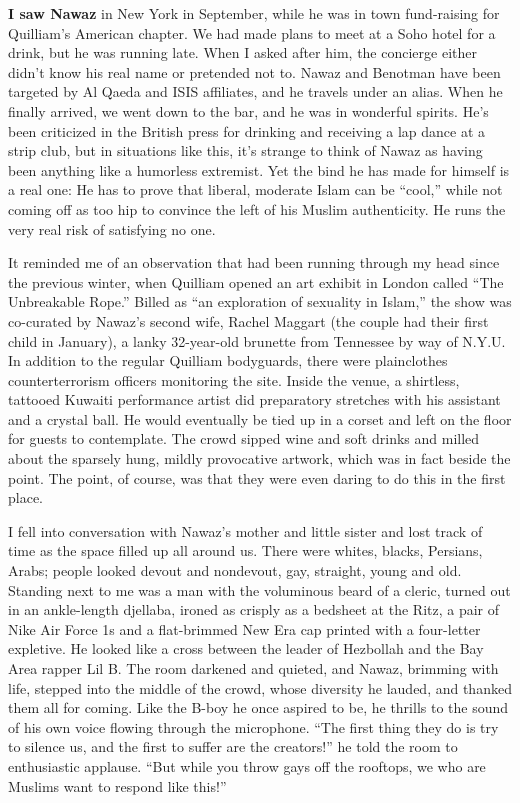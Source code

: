 \textbf{I saw Nawaz} in New York in September, while he was in town
fund-raising for Quilliam's American chapter. We had made plans to meet
at a Soho hotel for a drink, but he was running late. When I asked after
him, the concierge either didn't know his real name or pretended not to.
Nawaz and Benotman have been targeted by Al Qaeda and ISIS affiliates,
and he travels under an alias. When he finally arrived, we went down to
the bar, and he was in wonderful spirits. He's been criticized in the
British press for drinking and receiving a lap dance at a strip club,
but in situations like this, it's strange to think of Nawaz as having
been anything like a humorless extremist. Yet the bind he has made for
himself is a real one: He has to prove that liberal, moderate Islam can
be ``cool,'' while not coming off as too hip to convince the left of his
Muslim authenticity. He runs the very real risk of satisfying no one.

It reminded me of an observation that had been running through my head
since the previous winter, when Quilliam opened an art exhibit in London
called ``The Unbreakable Rope.'' Billed as ``an exploration of sexuality
in Islam,'' the show was co-curated by Nawaz's second wife, Rachel
Maggart (the couple had their first child in January), a lanky
32-year-old brunette from Tennessee by way of N.Y.U. In addition to the
regular Quilliam bodyguards, there were plainclothes counterterrorism
officers monitoring the site. Inside the venue, a shirtless, tattooed
Kuwaiti performance artist did preparatory stretches with his assistant
and a crystal ball. He would eventually be tied up in a corset and left
on the floor for guests to contemplate. The crowd sipped wine and soft
drinks and milled about the sparsely hung, mildly provocative artwork,
which was in fact beside the point. The point, of course, was that they
were even daring to do this in the first place.

I fell into conversation with Nawaz's mother and little sister and lost
track of time as the space filled up all around us. There were whites,
blacks, Persians, Arabs; people looked devout and nondevout, gay,
straight, young and old. Standing next to me was a man with the
voluminous beard of a cleric, turned out in an ankle-length djellaba,
ironed as crisply as a bedsheet at the Ritz, a pair of Nike Air Force 1s
and a flat-brimmed New Era cap printed with a four-letter expletive. He
looked like a cross between the leader of Hezbollah and the Bay Area
rapper Lil B. The room darkened and quieted, and Nawaz, brimming with
life, stepped into the middle of the crowd, whose diversity he lauded,
and thanked them all for coming. Like the B-boy he once aspired to be,
he thrills to the sound of his own voice flowing through the microphone.
``The first thing they do is try to silence us, and the first to suffer
are the creators!'' he told the room to enthusiastic applause. ``But
while you throw gays off the rooftops, we who are Muslims want to
respond like this!''

